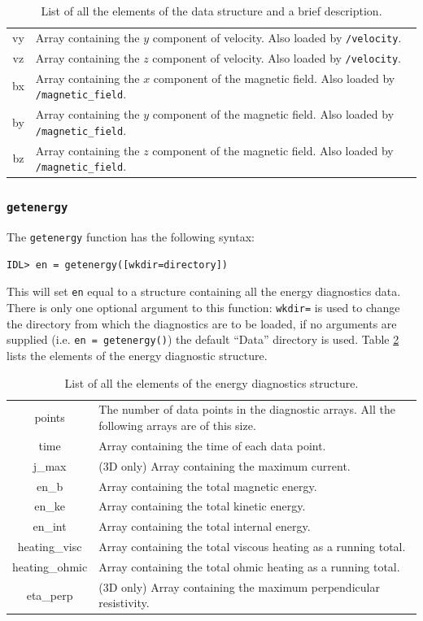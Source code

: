 \documentclass[11pt]{article}
\begin{document}
\begin{table}[!htbp]
\begin{center}
\begin{tabular}{|c|p{}|}
vy&Array containing the $y$ component of velocity. Also loaded by \texttt{/velocity}.\\
vz&Array containing the $z$ component of velocity. Also loaded by \texttt{/velocity}.\\
bx&Array containing the $x$ component of the magnetic field. Also loaded by \texttt{/magnetic\_field}.\\
by&Array containing the $y$ component of the magnetic field. Also loaded by \texttt{/magnetic\_field}.\\
bz&Array containing the $z$ component of the magnetic field. Also loaded by \texttt{/magnetic\_field}.\\
\hline
\end{tabular}
\end{center}
\caption{List of all the elements of the data structure and a brief description.}
\label{datastructure}
\end{table} 

\subsubsection{\texttt{getenergy}}
The \texttt{getenergy} function has the following syntax:
\begin{verbatim}
IDL> en = getenergy([wkdir=directory])
\end{verbatim}
This will set \texttt{en} equal to a structure containing all the energy diagnostics data. There is only one optional argument to this function: \texttt{wkdir=} is used to change the directory from which the diagnostics are to be loaded, if no arguments are supplied (i.e. \texttt{en = getenergy()}) the default ``Data'' directory is used. Table \ref{enstructure} lists the elements of the energy diagnostic structure.

\begin{table}[!htbp]
\begin{tabular}{|c|p{}|}
\hline
points& The number of data points in the diagnostic arrays. All the following arrays are of this size.\\
time& Array containing the time of each data point.\\
j\_max& (3D only) Array containing the maximum current.\\
en\_b & Array containing the total magnetic energy.\\
en\_ke & Array containing the total kinetic energy.\\
en\_int&Array containing the total internal energy.\\
heating\_visc& Array containing the total viscous heating as a running total.\\
heating\_ohmic& Array containing the total ohmic heating as a running total.\\
eta\_perp& (3D only) Array containing the maximum perpendicular resistivity.\\
\hline
\end{tabular}
\caption{List of all the elements of the energy diagnostics structure.}
\label{enstructure}
\end{table}
\end{document}
